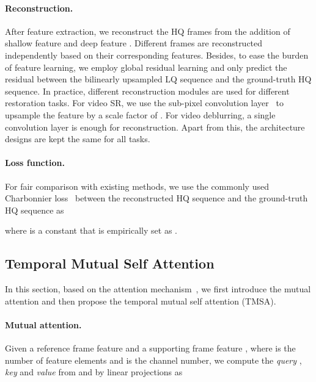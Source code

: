 \documentclass[10pt,twocolumn,letterpaper]{article}
\newlength \g
\begin{document}
\vspace{-0.4cm}
\paragraph{Reconstruction.}
After feature extraction, we reconstruct the HQ frames from the addition of shallow feature  and deep feature . Different frames are reconstructed independently based on their corresponding features. Besides, to ease the burden of feature learning, we employ global residual learning and only predict the residual between the bilinearly upsampled LQ sequence and the ground-truth HQ sequence. In practice, different reconstruction modules are used for different restoration tasks. For video SR, we use the sub-pixel convolution layer~\cite{shi2016subpixel} to upsample the feature by a scale factor of . For video deblurring, a single convolution layer is enough for reconstruction. Apart from this, the architecture designs are kept the same for all tasks.

\vspace{-0.4cm}
\paragraph{Loss function.}
For fair comparison with existing methods, we use the commonly used Charbonnier loss~\cite{charbonnier1994Charbonnier} between the reconstructed HQ sequence  and the ground-truth HQ sequence  as

where  is a constant that is empirically set as . 



\subsection{Temporal Mutual Self Attention}
\label{sec:mama}
In this section, based on the attention mechanism~\cite{vaswani2017transformer, li2021trear, wick2021transformer}, we first introduce the mutual attention and then propose the temporal mutual self attention (TMSA).

\vspace{-0.4cm}
\paragraph{Mutual attention.}
Given a reference frame feature  and a supporting frame feature , where  is the number of feature elements and  is the channel number, we compute the \textit{query} , \textit{key}  and \textit{value}  from  and  by linear projections as 
\end{document}
